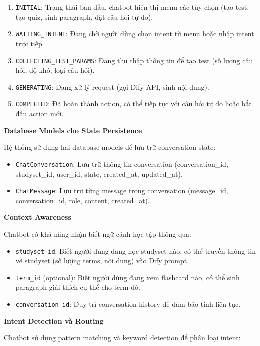 \documentclass[../DoAn.tex]{subfiles}
\begin{document}
\begin{enumerate}
    \item \texttt{INITIAL}: Trạng thái ban đầu, chatbot hiển thị menu các tùy chọn (tạo test, tạo quiz, sinh paragraph, đặt câu hỏi tự do).
    \item \texttt{WAITING\_INTENT}: Đang chờ người dùng chọn intent từ menu hoặc nhập intent trực tiếp.
    \item \texttt{COLLECTING\_TEST\_PARAMS}: Đang thu thập thông tin để tạo test (số lượng câu hỏi, độ khó, loại câu hỏi).
    \item \texttt{GENERATING}: Đang xử lý request (gọi Dify API, sinh nội dung).
    \item \texttt{COMPLETED}: Đã hoàn thành action, có thể tiếp tục với câu hỏi tự do hoặc bắt đầu action mới.
\end{enumerate}

\textbf{Database Models cho State Persistence}

Hệ thống sử dụng hai database models để lưu trữ conversation state:

\begin{itemize}
    \item \texttt{ChatConversation}: Lưu trữ thông tin conversation (conversation\_id, studyset\_id, user\_id, state, created\_at, updated\_at).
    \item \texttt{ChatMessage}: Lưu trữ từng message trong conversation (message\_id, conversation\_id, role, content, created\_at).
\end{itemize}

\textbf{Context Awareness}

Chatbot có khả năng nhận biết ngữ cảnh học tập thông qua:

\begin{itemize}
    \item \texttt{studyset\_id}: Biết người dùng đang học studyset nào, có thể truyền thông tin về studyset (số lượng terms, nội dung) vào Dify prompt.
    \item \texttt{term\_id} (optional): Biết người dùng đang xem flashcard nào, có thể sinh paragraph giải thích cụ thể cho term đó.
    \item \texttt{conversation\_id}: Duy trì conversation history để đảm bảo tính liên tục.
\end{itemize}

\textbf{Intent Detection và Routing}

Chatbot sử dụng pattern matching và keyword detection để phân loại intent:
\end{document}

